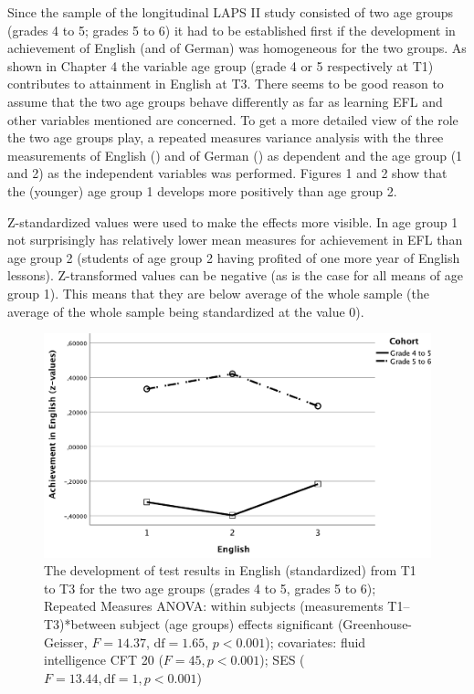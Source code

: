 \documentclass[output=paper]{langsci/langscibook}
\begin{document}
Since the sample of the longitudinal LAPS II study consisted of two age groups (grades 4 to 5; grades 5 to 6) it had to be established first if the development in achievement of English (and of German) was homogeneous for the two groups. As shown in Chapter 4 the variable age group (grade 4 or 5 respectively at T1) contributes to attainment in English at T3. There seems to be good reason to assume that the two age groups behave differently as far as learning EFL and other variables mentioned are concerned. To get a more detailed view of the role the two age groups play, a repeated measures variance analysis with the three measurements of English () and of German () as dependent and the age group (1 and 2) as the independent variables was performed. Figures 1 and 2 show that the (younger) age group 1 develops more positively than age group 2. 

Z-standardized values were used to make the effects more visible. In  age group 1 not surprisingly has relatively lower mean measures for achievement in EFL than age group 2 (students of age group 2 having profited of one more year of English lessons). Z-transformed values can be negative (as is the case for all means of age group 1). This means that they are below average of the whole sample (the average of the whole sample being standardized at the value 0). 

\begin{figure}
\includegraphics[width=\textwidth]{figures/figure9.1.pdf}
\caption{The development of test results in English (standardized) from T1 to T3 for the two age groups (grades 4 to 5, grades 5 to 6); Repeated Measures ANOVA: within subjects (measurements T1–T3)*between subject (age groups) effects significant (Greenhouse-Geisser, $F=14.37$, $\text{df}=1.65$, $p<0.001$); covariates: fluid intelligence CFT 20 ($F=45, p<0.001$); SES ($F=13.44, \text{df}=1, p<0.001$)\label{fig:09:1}}
\end{figure}
\end{document}
